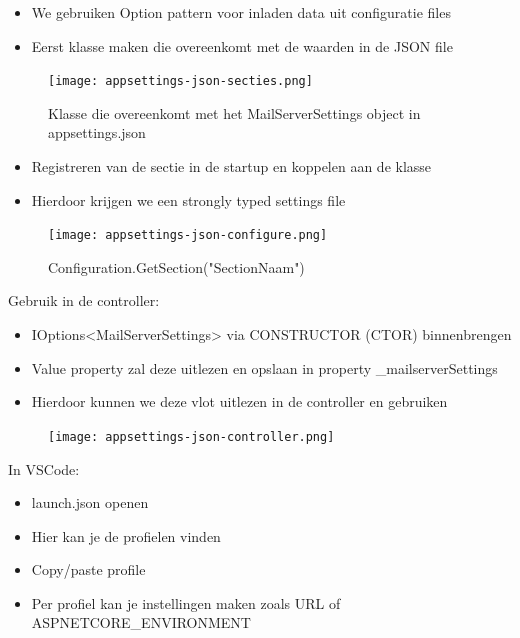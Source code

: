 \documentclass{article}
\begin{document}
\begin{itemize}
    \item We gebruiken Option pattern voor inladen data uit configuratie files
    \item Eerst klasse maken die overeenkomt met de waarden in de JSON file
\end{itemize}

\begin{figure}[H]
    \centering
    \texttt{[image: appsettings-json-secties.png]}
    \caption{Klasse die overeenkomt met het MailServerSettings object in appsettings.json}
\end{figure}

\begin{itemize}
    \item Registreren van de sectie in de startup en koppelen aan de klasse
    \item Hierdoor krijgen we een strongly typed settings file
\end{itemize}

\begin{figure}[H]
    \centering
    \texttt{[image: appsettings-json-configure.png]}
    \caption{Configuration.GetSection("SectionNaam")}
\end{figure}

Gebruik in de controller: 

\begin{itemize}
    \item IOptions<MailServerSettings> via CONSTRUCTOR (CTOR) binnenbrengen
    \item Value property zal deze uitlezen en opslaan in property \_mailserverSettings
    \item Hierdoor kunnen we deze vlot uitlezen in de controller en gebruiken
\end{itemize}

\begin{figure}[H]
    \centering
    \texttt{[image: appsettings-json-controller.png]}
    \caption{}
\end{figure}

In VSCode:

\begin{itemize}
    \item launch.json openen
    \item Hier kan je de profielen vinden
    \item Copy/paste profile
    \item Per profiel kan je instellingen maken zoals URL of ASPNETCORE\_ENVIRONMENT
\end{itemize}
\end{document}
